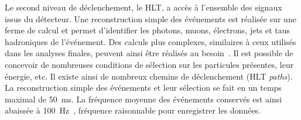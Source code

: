 \par Le second niveau de déclenchement, le HLT, a accès à l'ensemble des signaux issus du détecteur.
Une reconstruction simple des événements est réalisée sur une ferme de calcul et permet d'identifier les photons, muons, électrons, jets et taus hadroniques de l'événement.
Des calculs plus complexes, similaires à ceux utilisés dans les analyses finales, peuvent ainsi être réalisés au besoin~\cite{cms_paper}.
Il est possible de concevoir de nombreuses conditions de sélection sur les particules présentes, leur énergie, etc.
Il existe ainsi de nombreux chemins de déclenchement (HLT \emph{paths}).
La reconstruction simple des événements et leur sélection se fait en un temps maximal de \SI{50}{\milli\second}.
La fréquence moyenne des événements conservés est ainsi abaissée à \SI{100}{\hertz}~\cite{cms_paper,CMS-TRG-12-001}, fréquence raisonnable pour enregistrer les données.